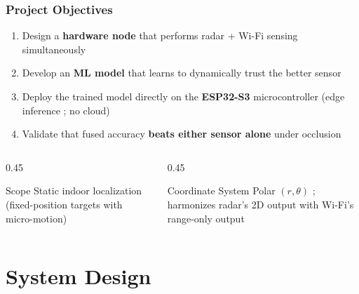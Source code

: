 \documentclass[
	11pt,
	aspectratio=169,
]{beamer}
\begin{document}

\begin{frame}
	\frametitle{Project Objectives}

	\begin{enumerate}
		\item Design a \textbf{hardware node} that performs radar + Wi-Fi sensing simultaneously
		\item Develop an \textbf{ML model} that learns to dynamically trust the better sensor
		\item Deploy the trained model directly on the \textbf{ESP32-S3} microcontroller (\alert{edge inference} ; no cloud)
		\item Validate that fused accuracy \textbf{beats either sensor alone} under occlusion
	\end{enumerate}

	\bigskip

	\begin{columns}[c]
		\begin{column}{0.45\textwidth}
			\begin{block}{Scope}
				Static indoor localization (fixed-position targets with micro-motion)
			\end{block}
		\end{column}
		\begin{column}{0.45\textwidth}
			\begin{exampleblock}{Coordinate System}
				Polar $(r, \theta)$ ; harmonizes radar's 2D output with Wi-Fi's range-only output
			\end{exampleblock}
		\end{column}
	\end{columns}
\end{frame}


\section{System Design}
\end{document}
